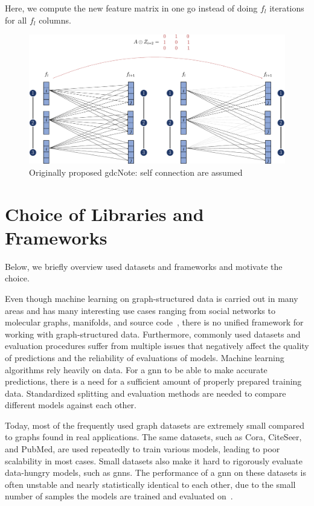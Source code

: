 Here, we compute the new feature matrix in one go instead of doing $f_{l}$ iterations for all $f_{l}$ columns.
\begin{figure}[ht]
    \centering
    \includegraphics[width= 0.90\linewidth]{gfx/implementation/GDC-eq5.pdf}
    \caption{Originally proposed \ac{gdc}Note: self connection are assumed}\label{fig:implementaion:GDC-eq5}
\end{figure}

\section{Choice of Libraries and Frameworks}
\label{sec:implement:frameworks}
Below, we briefly overview used datasets and frameworks and motivate the choice.

Even though machine learning on graph-structured data is carried out in many areas and has many interesting use cases ranging from social networks to molecular graphs, manifolds, and source code~\cite{Hu2020},
there is no unified framework for working with graph-structured data. Furthermore, commonly used datasets and evaluation procedures suffer from multiple issues that negatively affect the quality of predictions and the reliability of evaluations of models.
Machine learning algorithms rely heavily on data. For a \ac{gnn} to be able to make accurate predictions, there is a need for a sufficient amount of properly prepared training data. Standardized splitting and evaluation methods are needed to compare different models against each other.

Today, most of the frequently used graph datasets are extremely small compared to graphs found in real applications. The same datasets, such as Cora, CiteSeer, and PubMed, are used repeatedly to train various models, leading to poor scalability in most cases. Small datasets also make it hard to rigorously evaluate data-hungry models, such as \acfp{gnn}. The performance of a \ac{gnn} on these datasets is often unstable and nearly statistically identical to each other, due to the small number of samples the models are trained and evaluated on~\cite{Kipf2017,Xu2019, Hu2020}.

